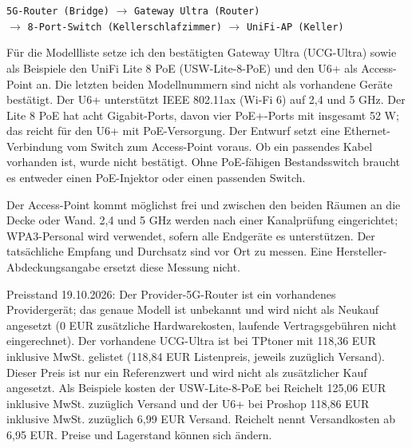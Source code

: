 \documentclass[a4paper,11pt]{article}
\begin{document}
\begin{center}\small
\texttt{5G-Router (Bridge)} $\rightarrow$ \texttt{Gateway Ultra (Router)}\\
$\rightarrow$ \texttt{8-Port-Switch (Kellerschlafzimmer)} $\rightarrow$ \texttt{UniFi-AP (Keller)}
\end{center}

Für die Modellliste setze ich den bestätigten Gateway Ultra (UCG-Ultra) sowie als Beispiele den UniFi Lite 8 PoE (USW-Lite-8-PoE) und den U6+ als Access-Point an. Die letzten beiden Modellnummern sind nicht als vorhandene Geräte bestätigt. Der U6+ unterstützt IEEE 802.11ax (Wi-Fi 6) auf 2,4 und 5 GHz. Der Lite 8 PoE hat acht Gigabit-Ports, davon vier PoE+-Ports mit insgesamt 52 W; das reicht für den U6+ mit PoE-Versorgung. Der Entwurf setzt eine Ethernet-Verbindung vom Switch zum Access-Point voraus. Ob ein passendes Kabel vorhanden ist, wurde nicht bestätigt. Ohne PoE-fähigen Bestandsswitch braucht es entweder einen PoE-Injektor oder einen passenden Switch.

Der Access-Point kommt möglichst frei und zwischen den beiden Räumen an die Decke oder Wand. 2,4 und 5 GHz werden nach einer Kanalprüfung eingerichtet; WPA3-Personal wird verwendet, sofern alle Endgeräte es unterstützen. Der tatsächliche Empfang und Durchsatz sind vor Ort zu messen. Eine Hersteller-Abdeckungsangabe ersetzt diese Messung nicht.

Preisstand 19.10.2026: Der Provider-5G-Router ist ein vorhandenes Providergerät; das genaue Modell ist unbekannt und wird nicht als Neukauf angesetzt (0 EUR zusätzliche Hardwarekosten, laufende Vertragsgebühren nicht eingerechnet). Der vorhandene UCG-Ultra ist bei TPtoner mit 118,36 EUR inklusive MwSt. gelistet (118,84 EUR Listenpreis, jeweils zuzüglich Versand). Dieser Preis ist nur ein Referenzwert und wird nicht als zusätzlicher Kauf angesetzt. Als Beispiele kosten der USW-Lite-8-PoE bei Reichelt 125,06 EUR inklusive MwSt. zuzüglich Versand und der U6+ bei Proshop 118,86 EUR inklusive MwSt. zuzüglich 6,99 EUR Versand. Reichelt nennt Versandkosten ab 6,95 EUR. Preise und Lagerstand können sich ändern.
\end{document}
